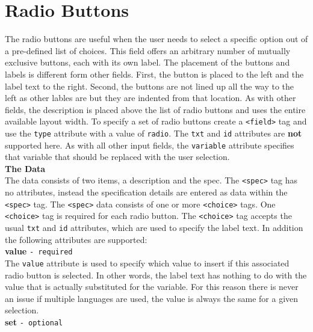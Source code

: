 \section{Radio Buttons}

The radio buttons are useful when the user needs to select a specific
option out of a pre-defined list of choices. This field offers an
arbitrary number of mutually exclusive buttons, each with its own label.
The placement of the buttons and labels is different form other fields.
First, the button is placed to the left and the label text to the right.
Second, the buttons are not lined up all the way to the left as other
lables are but they are indented from that location. As with other
fields, the description is placed above the list of radio buttons and
uses the entire available layout width. To specify a set of radio
buttons create a \texttt{<field>} tag and use the \texttt{type}
attribute with a value of \texttt{radio}. The \texttt{txt} and
\texttt{id} attributes are \textbf{not} supported here. As with all
other input fields, the \texttt{variable} attribute specifies that
variable that should be replaced with the user selection.\\

\textbf{The Data}\\

The data consists of two items, a description and the spec. The
\texttt{<spec>} tag has no attributes, instead the specification details
are entered as data within the \texttt{<spec>} tag. The \texttt{<spec>}
data consists of one or more \texttt{<choice>} tags. One
\texttt{<choice>} tag is required for each radio button. The
\texttt{<choice>} tag accepts the usual \texttt{txt} and \texttt{id}
attributes, which are used to specify the label text. In addition the
following attributes are supported:\\

\textbf{value} \texttt{- required}\\

The \texttt{value} attribute is used to specify which value to insert if
this associated radio button is selected. In other words, the label text
has nothing to do with the value that is actually substituted for the
variable. For this reason there is never an issue if multiple languages
are used, the value is always the same for a given selection.\\

\textbf{set} \texttt{- optional}\\


